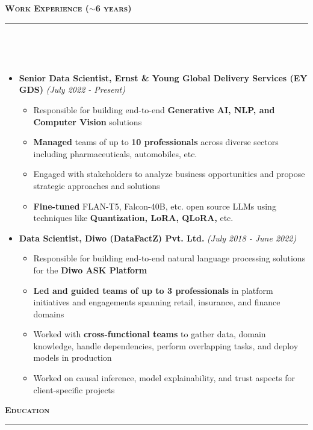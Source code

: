 \documentclass[a4paper,10pt]{article}
\newcommand{\isep}{-2 pt}
\newcommand{\lsep}{-0.5cm}
\newcommand{\resheading}[1]{{\small
        {
            \begin{minipage}
                {0.992\textwidth}\textbf{{\textsc{#1 \vphantom{p\^{E}} }}}
                \\[-0.3cm]
                \hrule
            \end{minipage}
            \\[-0.5cm]
        }
 }}
\begin{document}
\vspace{4pt}
\noindent
\resheading{\textbf{\large Work Experience ($\sim$6 years)}}\\[\lsep]
\vspace{4pt}
\begin{itemize}
    \item \textbf{Senior Data Scientist, Ernst \& Young Global Delivery Services (EY GDS)} \hfill {\emph{(July 2022 - Present)}}
    \\ [-0.6cm]
    \begin{itemize}\itemsep \isep
        \item Responsible for building end-to-end \textbf{Generative AI, NLP, and Computer Vision} solutions
        \item \textbf{Managed} teams of up to \textbf{10 professionals} across diverse sectors including pharmaceuticals, automobiles, etc.
        \item Engaged with stakeholders to analyze business opportunities and propose strategic approaches and solutions
        \item \textbf{Fine-tuned} FLAN-T5, Falcon-40B, etc. open source LLMs using techniques like \textbf{Quantization, LoRA, QLoRA,} etc.
    \\ [-0.5cm]
    \end{itemize}
    
    \item \textbf{Data Scientist, Diwo (DataFactZ) Pvt. Ltd.} \hfill {\emph{(July 2018 - June 2022)}}
    \\ [-0.6cm]
    \begin{itemize}\itemsep \isep
        \item Responsible for building end-to-end natural language processing solutions for the \textbf{Diwo ASK Platform}
        \item \textbf{Led and guided teams of up to 3 professionals} in platform initiatives and engagements spanning retail, insurance, and finance domains
        \item Worked with \textbf{cross-functional teams} to gather data, domain knowledge, handle dependencies, perform overlapping tasks, and deploy models in production  
        \item Worked on causal inference, model explainability, and trust aspects for client-specific projects
    \\ [-0.5cm]
    \end{itemize}

\end{itemize}
\vspace{4pt}
\noindent
\resheading{\textbf{\large Education}}\\[\lsep]
\vspace{0pt}
\end{document}
